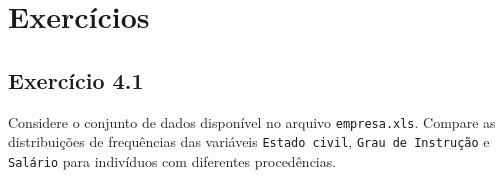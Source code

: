 \documentclass[
]{latex/krantz}
\theoremstyle{definition}
\theoremstyle{definition}
\theoremstyle{definition}
\theoremstyle{definition}
\theoremstyle{remark}
\begin{document}
\hypertarget{exercuxedcios-2}{%
\section{Exercícios}\label{exercuxedcios-2}}

\hypertarget{exr4-1}{%
\subsection*{Exercício 4.1}\label{exr4-1}}

Considere o conjunto de dados disponível no arquivo \texttt{empresa.xls}. Compare as distribuições de frequências das variáveis \texttt{Estado\ civil}, \texttt{Grau\ de\ Instrução} e \texttt{Salário} para indivíduos com diferentes procedências.
\end{document}
